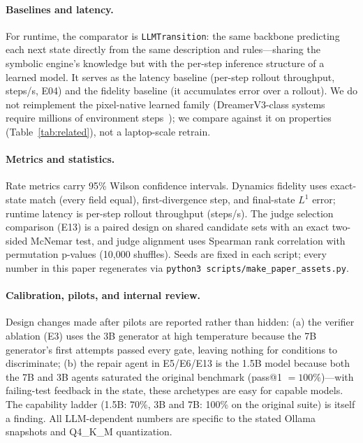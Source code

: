 \documentclass[11pt]{article}
\begin{document}
\paragraph{Baselines and latency.} For runtime, the comparator is
\texttt{LLMTransition}: the same backbone predicting each next state directly
from the same description and rules---sharing the symbolic engine's knowledge
but with the per-step inference structure of a learned model. It serves as the
latency baseline (per-step rollout throughput, steps/s, E04) and the
fidelity baseline (it accumulates error over a rollout). We do not reimplement
the pixel-native learned family (DreamerV3-class systems require millions of
environment steps~\cite{dreamerv3}); we compare against it on properties
(Table~\ref{tab:related}), not a laptop-scale retrain.

\paragraph{Metrics and statistics.} Rate metrics carry 95\% Wilson confidence
intervals. Dynamics fidelity uses exact-state match (every field equal),
first-divergence step, and final-state $L^1$ error; runtime latency is per-step
rollout throughput (steps/s). The judge selection comparison (E13) is a paired
design on shared candidate sets with an exact two-sided McNemar test, and judge
alignment uses Spearman rank correlation with permutation p-values (10{,}000
shuffles). Seeds are fixed in each script; every number in this paper
regenerates via \texttt{python3 scripts/make\_paper\_assets.py}.

\paragraph{Calibration, pilots, and internal review.} Design changes made
after pilots are reported rather than hidden: (a) the verifier ablation (E3)
uses the 3B generator at high temperature because the 7B generator's first
attempts passed every gate, leaving nothing for conditions to discriminate;
(b) the repair agent in E5/E6/E13 is the 1.5B model because both the 7B and
3B agents saturated the original benchmark (pass@1 $=100\%$)---with
failing-test feedback in the state, these archetypes are easy for capable
models. The capability ladder (1.5B: 70\%, 3B and 7B: 100\% on the original
suite) is itself a finding. All LLM-dependent numbers are
specific to the stated Ollama snapshots and Q4\_K\_M quantization.

\end{document}
